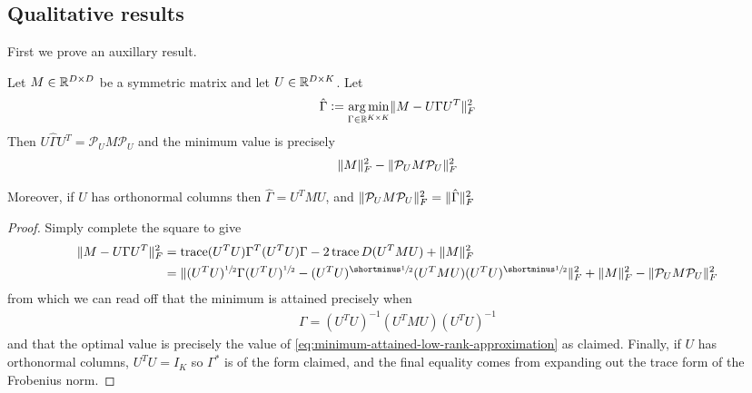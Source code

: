 \subsection{Qualitative results}\label{sec:no-spurious-local-minima-qualitative}
First we prove an auxillary result.
\begin{lemma}\label{lem:least-squares-projected-signal}
Let $M \in \mathbb{R}^{D \times D}$ be a symmetric matrix and let $U \in \mathbb{R}^{D \times K}$.
Let
\begin{align*}
    \hat{\Gamma} \vcentcolon= \operatorname*{arg\,min}_{\Gamma \in \mathbb{R}^{K \times K}} \lVert M - U \Gamma U^T\rVert_F^2
\end{align*}
Then $U \hat{\Gamma} U^T = \mathcal{P}_U M \mathcal{P}_U$ and the minimum value is precisely
\begin{align}\label{eq:minimum-attained-low-rank-approximation}
\lVert M\rVert_F^2 - \lVert\mathcal{P}_U M \mathcal{P}_U\rVert_F^2
\end{align}

Moreover, if $U$ has orthonormal columns then $\hat{\Gamma} = U^T M U$, and $\lVert\mathcal{P}_U M \mathcal{P}_U\rVert_F^2 = \lVert\hat{\Gamma}\rVert_F^2$
\end{lemma}
\begin{proof}
    Simply complete the square to give
    \begin{align*}
        \norm{M - U \Gamma U^T}_F^2
        &= \tr (U^T U) \Gamma^T (U^T U) \Gamma - 2 \tr D (U^T M U) + \norm{M}_F^2 \\
        &= \norm{(U^T U)^\half \Gamma (U^T U)^\half - (U^T U)^\mhalf (U^T M U) (U^T U)^\mhalf}_F^2 + \norm{M}_F^2 - \norm{\mathcal{P}_U M \mathcal{P}_U}_F^2
    \end{align*}
    from which we can read off that the minimum is attained precisely when
    \begin{align*}
        \Gamma = (U^T U)^{-1} (U^T M U) (U^T U)^{-1}
    \end{align*}
    and that the optimal value is precisely the value of \cref{eq:minimum-attained-low-rank-approximation} as claimed.
    Finally, if $U$ has orthonormal columns, $U^T U = I_K$ so $\Gamma^*$ is of the form claimed, and the final equality comes from expanding out the trace form of the Frobenius norm.
\end{proof}

